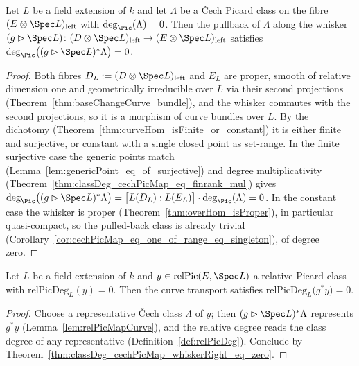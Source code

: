 \begin{theorem}
  \label{thm:classDeg_cechPicMap_whiskerRight_eq_zero}
  \leanok
  Let \(L\) be a field extension of \(k\) and let \(\Lambda\) be a \v Cech Picard class
  on the fibre \((E \otimes \Spec L)_{\mathrm{left}}\) with
  \(\deg_{\Pic}(\Lambda) = 0\). Then the pullback of \(\Lambda\) along the whisker
  \((g \rhd \Spec L) \colon (D \otimes \Spec L)_{\mathrm{left}} \to
  (E \otimes \Spec L)_{\mathrm{left}}\) satisfies
  \(\deg_{\Pic}\bigl((g \rhd \Spec L)^{*}\Lambda\bigr) = 0\).
\end{theorem}
\begin{proof}
  \leanok
  Both fibres \(D_L := (D \otimes \Spec L)_{\mathrm{left}}\) and \(E_L\) are proper,
  smooth of relative dimension one and geometrically irreducible over \(L\) via their
  second projections (Theorem~\ref{thm:baseChangeCurve_bundle}), and the whisker
  commutes with the second projections, so it is a morphism of curve bundles over
  \(L\). By the dichotomy (Theorem~\ref{thm:curveHom_isFinite_or_constant}) it is
  either finite and surjective, or constant with a single closed point as set-range.
  In the finite surjective case the generic points match
  (Lemma~\ref{lem:genericPoint_eq_of_surjective}) and degree multiplicativity
  (Theorem~\ref{thm:classDeg_cechPicMap_eq_finrank_mul}) gives
  \(\deg_{\Pic}\bigl((g \rhd \Spec L)^{*}\Lambda\bigr)
    = \bigl[L(D_L) : L(E_L)\bigr] \cdot \deg_{\Pic}(\Lambda) = 0\).
  In the constant case the whisker is proper (Theorem~\ref{thm:overHom_isProper}), in
  particular quasi-compact, so the pulled-back class is already trivial
  (Corollary~\ref{cor:cechPicMap_eq_one_of_range_eq_singleton}), of degree zero.
\end{proof}

\begin{theorem}
  \label{thm:relPicDeg_relPicMapCurveApp_eq_zero}
  \leanok
  Let \(L\) be a field extension of \(k\) and \(y \in \mathrm{relPic}(E, \Spec L)\) a
  relative Picard class with \(\mathrm{relPicDeg}_L(y) = 0\). Then the curve transport
  satisfies \(\mathrm{relPicDeg}_L\bigl(g^{*}y\bigr) = 0\).
\end{theorem}
\begin{proof}
  \leanok
  Choose a representative \v Cech class \(\Lambda\) of \(y\); then
  \((g \rhd \Spec L)^{*}\Lambda\) represents \(g^{*}y\)
  (Lemma~\ref{lem:relPicMapCurve}), and the relative degree reads the class degree of
  any representative (Definition~\ref{def:relPicDeg}). Conclude by
  Theorem~\ref{thm:classDeg_cechPicMap_whiskerRight_eq_zero}.
\end{proof}


